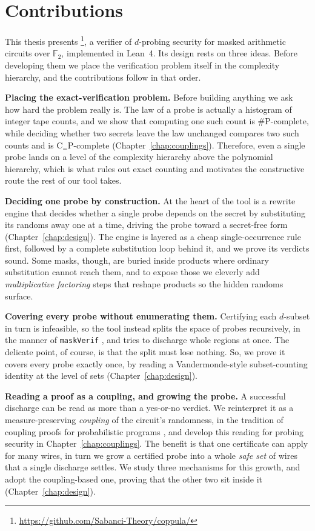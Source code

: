 \section{Contributions}
\label{sec:intro-contributions} 

This thesis presents \toolname\footnote{\url{https://github.com/Sabanci-Theory/coppula/}}, a verifier of $d$-probing security for masked
arithmetic circuits over $\mathbb{F}_2$, implemented in Lean~4. Its design rests on
three ideas. Before developing them we place the verification problem itself in the
complexity hierarchy, and the contributions follow in that order.

\textbf{Placing the exact-verification problem.} Before building anything we ask
how hard the problem really is. The law of a probe is actually a histogram of integer tape counts,
and we show that computing one such count is $\#\mathrm{P}$-complete, while deciding
whether two secrets leave the law unchanged compares two such counts and is
$\mathrm{C}_{=}\mathrm{P}$-complete (Chapter~\ref{chap:couplings}). Therefore, even a single
probe lands on a level of the complexity hierarchy above the polynomial hierarchy,
which is what rules out exact counting and motivates the constructive
route the rest of our tool takes.

\textbf{Deciding one probe by construction.} At the heart of the tool is a
rewrite engine that decides whether a single probe depends on the secret by
substituting its randoms away one at a time, driving the probe toward a
secret-free form (Chapter~\ref{chap:design}). The engine is layered as a cheap
single-occurrence rule first, followed by a complete substitution loop behind it,
and we prove its verdicts sound. Some masks, though, are buried inside products where ordinary
substitution cannot reach them, and to expose those we cleverly add \emph{multiplicative
factoring} steps that reshape products so the hidden randoms surface.

\textbf{Covering every probe without enumerating them.} Certifying each
$d$-subset in turn is infeasible, so the tool instead splits the space of
probes recursively, in the manner of \texttt{maskVerif}
\parencite{10.1007/978-3-030-29959-0_15}, and tries to discharge whole regions at once.
The delicate point, of course, is that the split must lose nothing. So, we prove it covers every
probe exactly once, by reading a Vandermonde-style subset-counting identity at
the level of sets (Chapter~\ref{chap:design}).

\textbf{Reading a proof as a coupling, and growing the probe.} A successful
discharge can be read as more than a yes-or-no verdict. We reinterpret it as a
measure-preserving \emph{coupling} of the circuit's randomness, in the tradition of
coupling proofs for probabilistic programs \parencite{barthe2017coupling}, and
develop this reading for probing security in Chapter~\ref{chap:couplings}. The
benefit is that one certificate can apply for many wires, in turn we grow a certified probe
into a whole \emph{safe set} of wires that a single discharge settles. We study three
mechanisms for this growth, and adopt the coupling-based one, proving that the other
two sit inside it (Chapter~\ref{chap:design}).

